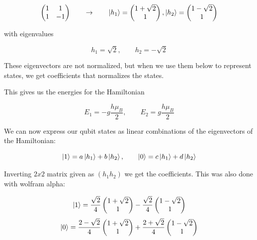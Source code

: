 \documentclass[a4paper,norsk, 10pt]{article}
\begin{document}
\begin{equation}
\begin{pmatrix}
1 & 1 \\
1 & -1
\end{pmatrix}
\qquad
\rightarrow
\qquad
\ket{h_1} = 
\begin{pmatrix}
1 + \sqrt{2} \\ 1
\end{pmatrix},
\ket{h_2} = 
\begin{pmatrix}
1 - \sqrt{2} \\ 1
\end{pmatrix}
\end{equation}

with eigenvalues

\begin{equation}
h_1 = \sqrt{2},\qquad h_2  = -\sqrt{2}
\end{equation}

These eigenvectors are not normalized, but when we use them below to represent states, we get coefficients that normalizes the states. 

This gives us the energies for the Hamiltonian

\begin{equation}
E_1 = -g\frac{h\mu_B}{2}, \qquad E_2 = g\frac{h\mu_B}{2}
\end{equation}

We can now express our qubit states as linear combinations of the eigenvectors of the Hamiltonian:

\begin{equation}
\ket{1} = a\ket{h_1} + b\ket{h_2}, \qquad \ket{0} = c\ket{h_1} + d\ket{h_2}
\end{equation}

Inverting $2x2$ matrix given as $(h_1 h_2)$ we get the coefficients. This was also done with wolfram alpha:

\begin{equation}
\ket{1} = \frac{\sqrt{2}}{4}
\begin{pmatrix}
1 + \sqrt{2} \\ 1
\end{pmatrix}
-\frac{\sqrt{2}}{4}
\begin{pmatrix}
1 - \sqrt{2} \\ 1
\end{pmatrix}
\end{equation}
\begin{equation}
\ket{0} = \frac{2-\sqrt{2}}{4}
\begin{pmatrix}
1 + \sqrt{2} \\ 1
\end{pmatrix}
+\frac{2+\sqrt{2}}{4}
\begin{pmatrix}
1 - \sqrt{2} \\ 1
\end{pmatrix}
\end{equation}
\end{document}
